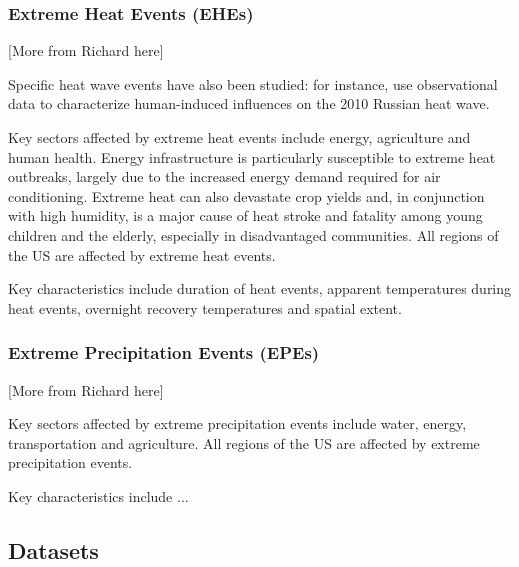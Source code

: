 \documentclass[11pt]{article}
\begin{document}
\subsubsection*{Extreme Heat Events (EHEs)}

{\color{red}[More from Richard here]}

Specific heat wave events have also been studied:  for instance, \cite{dole2011grl} use observational data to characterize human-induced influences on the 2010 Russian heat wave.  

Key sectors affected by extreme heat events include energy, agriculture and human health.  Energy infrastructure is particularly susceptible to extreme heat outbreaks, largely due to the increased energy demand required for air conditioning.  Extreme heat can also devastate crop yields and, in conjunction with high humidity, is a major cause of heat stroke and fatality among young children and the elderly, especially in disadvantaged communities.  All regions of the US are affected by extreme heat events.

Key characteristics include duration of heat events, apparent temperatures during heat events, overnight recovery temperatures and spatial extent.

\subsubsection*{Extreme Precipitation Events (EPEs)}

{\color{red}[More from Richard here]}

Key sectors affected by extreme precipitation events include water, energy, transportation and agriculture.  All regions of the US are affected by extreme precipitation events.

Key characteristics include ...


\subsection{Datasets} \label{sec:Datasets}
\end{document}
